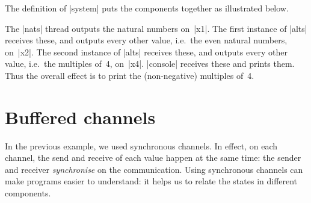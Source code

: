 
The definition of |system| puts the components together as illustrated below.  
%
\begin{center}
\end{center}
%
The |nats| thread outputs the natural numbers on~|x1|.  The first instance of
|alts| receives these, and outputs every other value, i.e.~the even natural
numbers, on~|x2|.  The second instance of |alts| receives these, and outputs
every other value, i.e.~the multiples of~4, on~|x4|.  |console| receives these
and prints them.  Thus the overall effect is to print the (non-negative)
multiples of~4.


\section{Buffered channels}

In the previous example, we used synchronous channels.  In effect, on each
channel, the send and receive of each value happen at the same time: the
sender and receiver \emph{synchronise} on the communication.
%
Using synchronous channels can make programs easier to understand: it helps us
to relate the states in different components.

